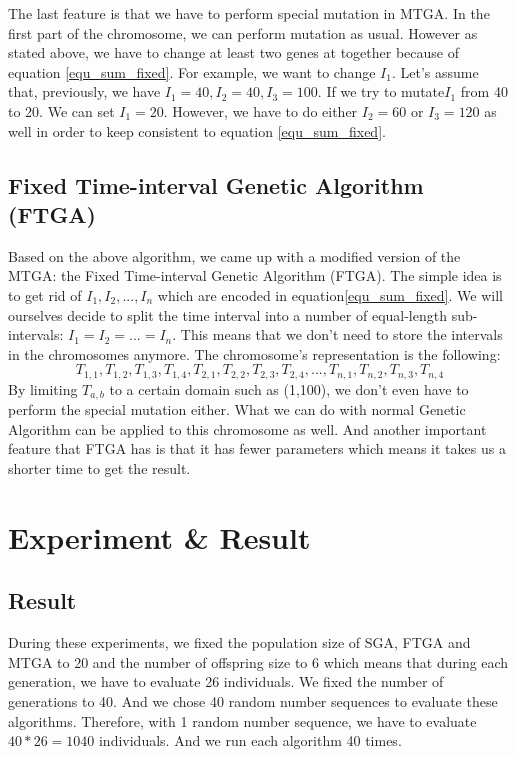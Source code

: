 \documentclass{article} %
\begin{document}
The last feature is that we have to perform special mutation in MTGA. In the first part of the chromosome, we can perform mutation as usual. However as stated above, we have to change at least two genes at together because of equation \ref{equ_sum_fixed}. For example, we want to change ${I_1}$. Let's assume that, previously, we have $I_1 = 40, I_2 = 40, I_3 = 100$. If we try to mutate$I_1$ from 40 to 20. We can set $I_1 = 20$. However, we have to do either $I_2=60$ or $I_3=120$ as well in order to keep consistent to equation \ref{equ_sum_fixed}. 


\subsection{Fixed Time-interval Genetic Algorithm (FTGA)}
Based on the above algorithm, we came up with a modified version of the MTGA: the Fixed Time-interval Genetic Algorithm (FTGA). The simple idea is to get rid of $I_1, I_2, ..., I_n$ which are encoded in equation\ref{equ_sum_fixed}. We will ourselves decide to split the time interval into a number of equal-length sub-intervals: $I_1=I_2=...=I_n$. This means that we don't need to store the intervals in the chromosomes anymore. The chromosome's representation is the following:
\begin{equation}
T_{1,1}, T_{1,2}, T_{1,3}, T_{1,4},T_{2,1}, T_{2,2}, T_{2,3}, T_{2,4},...,T_{n,1}, T_{n, 2},T_{n,3}, T_{n, 4}
\end{equation}
By limiting $T_{a,b}$ to a certain domain such as (1,100), we don't even have to perform the special mutation either. What we can do with normal Genetic Algorithm can be applied to this chromosome as well. And another important feature that FTGA has is that it has fewer parameters which means it takes us a shorter time to get the result. 


\section{Experiment \& Result}
\subsection{Result}
During these experiments, we fixed the population size of SGA, FTGA and MTGA to 20 and the number of offspring size to 6 which means that during each generation, we have to evaluate 26 individuals. We fixed the number of generations to 40. And we chose 40 random number sequences to evaluate these algorithms. Therefore, with 1 random number sequence, we have to evaluate $40 * 26 = 1040$ individuals. And we run each algorithm 40 times.
\end{document}
